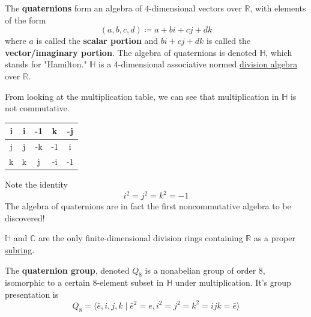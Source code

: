   \begin{definition}[Quaternions]
    \label{def:quaternions}
    The \textbf{quaternions} form an algebra of $4$-dimensional vectors over $\mathbb{R}$, with elements of the form
    \begin{equation}
      (a, b, c, d) \coloneqq a + bi + cj + dk
    \end{equation}
    where $a$ is called the \textbf{scalar portion} and $bi + cj + dk$ is called the \textbf{vector/imaginary portion}. The algebra of quaternions is denoted $\mathbb{H}$, which stands for "Hamilton." $\mathbb{H}$ is a $4$-dimensional associative normed \hyperref[def:division-algebra]{division algebra} over $\mathbb{R}$. 
  \end{definition}

  From looking at the multiplication table, we can see that multiplication in $\mathbb{H}$ is not commutative. 
  \begin{center}
    \begin{tabular}{|c|c|c|c|c|}
    \hline
    i & i & -1 & k & -j \\ 
    \hline
    j & j & -k & -1 & i \\ 
    \hline
    k & k & j & -i & -1 \\ 
    \hline
    \end{tabular}
  \end{center}
  Note the identity 
  \begin{equation}
    i^2 = j^2 = k^2 = -1
  \end{equation}
  The algebra of quaternions are in fact the first noncommutative algebra to be discovered! 

  \begin{theorem}
    \label{thm:frobenius-theorem-on-real-division-rings}
    $\mathbb{H}$ and $\mathbb{C}$ are the only finite-dimensional division rings containing $\mathbb{R}$ as a proper \hyperref[def:subring]{subring}. 
  \end{theorem}

  \begin{definition}
    \label{def:quaternion-group}
    The \textbf{quaternion group}, denoted $Q_8$ is a nonabelian group of order $8$, isomorphic to a certain $8$-element subset in $\mathbb{H}$ under multiplication. It's group presentation is 
    \begin{equation}
      Q_8 = \big\langle \bar{e}, i, j, k \;|\; \bar{e}^2 = e, i^2 = j^2 = k^2 = ijk = \bar{e} \big\rangle
    \end{equation}
  \end{definition}

